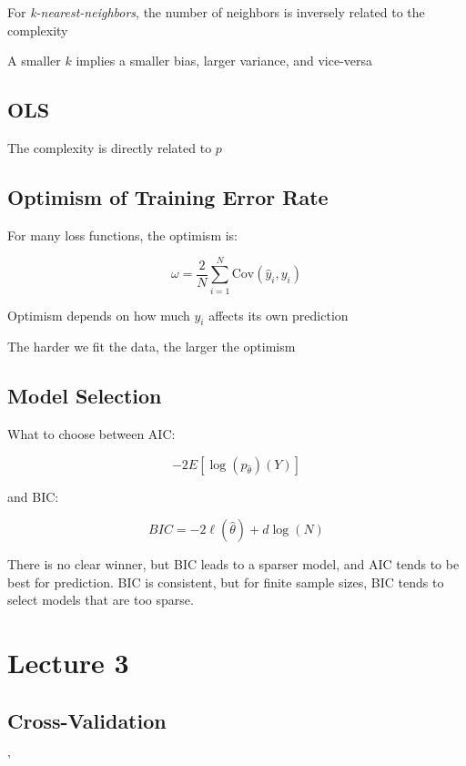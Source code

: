 \documentclass[twoside,twocolumn,10pt]{revtex4-1}
\begin{document}
	For \textit{k-nearest-neighbors}, the number of neighbors is inversely related to the complexity
	
	A smaller $k$ implies a smaller bias, larger variance, and vice-versa
	
	\subsection{OLS}
	
	The complexity is directly related to $p$
	
	\subsection{Optimism of Training Error Rate}
	
	For many loss functions, the optimism is:
	
	\begin{equation*}
	\omega = \frac{2}{N} \sum_{i=1}^N \text{Cov} (\hat{y}_i, y_i)
	\end{equation*}
	
	Optimism depends on how much $y_i$ affects its own prediction
	
	The harder we fit the data, the larger the optimism
	
	\subsection{Model Selection}
	
	What to choose between AIC:
	
	\begin{equation*}
	-2E[\log(p_{\hat{\theta}})(Y)]
	\end{equation*}
	
	and BIC:
	
	\begin{equation*}
	BIC = -2 \ell (\hat{\theta}) + d\log (N) 
	\end{equation*}
	
	There is no clear winner, but BIC leads to a sparser model, and AIC tends to be best for prediction.  BIC is consistent, but for finite sample sizes, BIC tends to select models that are too sparse.
	
	\section{Lecture 3}
	
	\subsection{Cross-Validation}'
	
\end{document}
